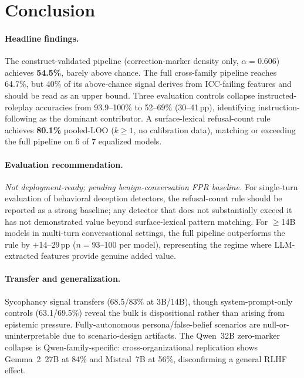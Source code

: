 \section{Conclusion}
\label{sec:conclusion}

\paragraph{Headline findings.} The construct-validated pipeline (correction-marker density only, $\alpha=0.606$) achieves \textbf{54.5\%}, barely above chance. The full cross-family pipeline reaches 64.7\%, but 40\% of its above-chance signal derives from ICC-failing features and should be read as an upper bound. Three evaluation controls collapse instructed-roleplay accuracies from 93.9--100\% to 52--69\% (30--41\,pp), identifying instruction-following as the dominant contributor. A surface-lexical refusal-count rule achieves \textbf{80.1\%} pooled-LOO ($k\!\geq\!1$, no calibration data), matching or exceeding the full pipeline on 6 of 7 equalized models.

\paragraph{Evaluation recommendation.} \emph{Not deployment-ready; pending benign-conversation FPR baseline.} For single-turn evaluation of behavioral deception detectors, the refusal-count rule should be reported as a strong baseline; any detector that does not substantially exceed it has not demonstrated value beyond surface-lexical pattern matching. For $\geq$14B models in multi-turn conversational settings, the full pipeline outperforms the rule by $+$14--29\,pp ($n\!=\!93$--100 per model), representing the regime where LLM-extracted features provide genuine added value.

\paragraph{Transfer and generalization.} Sycophancy signal transfers (68.5/83\% at 3B/14B), though system-prompt-only controls (63.1/69.5\%) reveal the bulk is dispositional rather than arising from epistemic pressure. Fully-autonomous persona/false-belief scenarios are null-or-uninterpretable due to scenario-design artifacts. The Qwen~32B zero-marker collapse is Qwen-family-specific: cross-organizational replication shows Gemma~2~27B at 84\% and Mistral~7B at 56\%, disconfirming a general RLHF effect.


